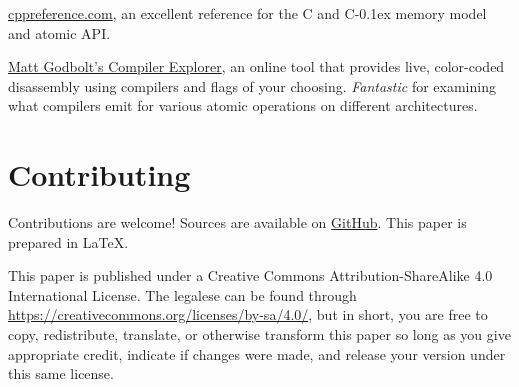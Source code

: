 \documentclass[fontsize=10pt, oneside]{scrartcl}
\newcommand{\cplusplus}[1]{C\kern-0.1ex\raisebox{0.15ex}{\texttt{++}}}
\newcommand{\clang}[1]{C}
\begin{document}
\href{https://en.cppreference.com}{cppreference.com},
an excellent reference for the \clang{} and \cplusplus{} memory model and atomic \textsc{API}.

\href{https://godbolt.org/}{Matt Godbolt's Compiler Explorer},
an online tool that provides live, color-coded disassembly using compilers and flags of your choosing.
\emph{Fantastic} for examining what compilers emit for various atomic operations on different architectures.

\section{Contributing}

Contributions are welcome!
Sources are available on
\href{https://github.com/sysprog21/concurrency-primer}{GitHub}.
This paper is prepared in \LaTeX{}.

This paper is published under a
Creative Commons Attribution-ShareAlike 4.0 International License.
The legalese can be found through
\url{https://creativecommons.org/licenses/by-sa/4.0/},
but in short,
you are free to copy, redistribute, translate, or otherwise transform this paper
so long as you give appropriate credit, indicate if changes were made,
and release your version under this same license.
\end{document}
